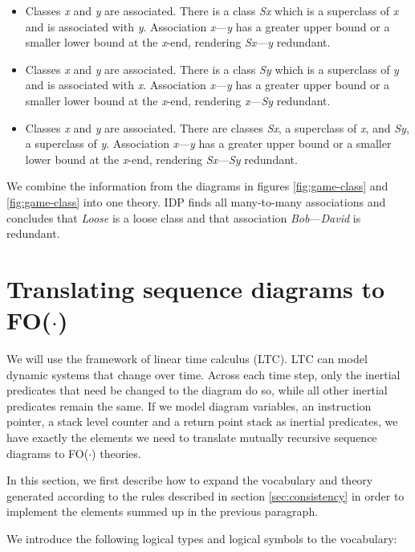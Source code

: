 \documentclass[conference]{IEEEtran}
\begin{document}
\begin{itemize}
	\item Classes \textit{x} and \textit{y} are associated. There is a class \textit{Sx} which is a superclass of \textit{x} and is associated with \textit{y}. Association \textit{x}---\textit{y} has a greater upper bound or a smaller lower bound at the \textit{x}-end, rendering \textit{Sx}---\textit{y} redundant.
	\item Classes \textit{x} and \textit{y} are associated. There is a class \textit{Sy} which is a superclass of \textit{y} and is associated with \textit{x}. Association \textit{x}---\textit{y} has a greater upper bound or a smaller lower bound at the \textit{x}-end, rendering \textit{x}---\textit{Sy} redundant.
	\item Classes \textit{x} and \textit{y} are associated. There are classes \textit{Sx}, a superclass of \textit{x}, and \textit{Sy}, a superclass of \textit{y}. Association \textit{x}---\textit{y} has a greater upper bound or a smaller lower bound at the \textit{x}-end, rendering \textit{Sx}---\textit{Sy} redundant. 
\end{itemize}

We combine the information from the diagrams in figures \ref{fig:game-class} and \ref{fig:game-class} into one theory. IDP finds all many-to-many associations and concludes that \textit{Loose} is a loose class and that association \textit{Bob}---\textit{David} is redundant.

\section{Translating sequence diagrams to FO($\cdot$)}\label{sec:seq}
We will use the framework of linear time calculus\cite{BogaertsBart2014Sdsu} (LTC). LTC can model dynamic systems that change over time. Across each time step, only the inertial predicates that need be changed to the diagram do so, while all other inertial predicates remain the same. If we model diagram variables, an instruction pointer, a stack level counter and a return point stack as inertial predicates, we have exactly the elements we need to translate mutually recursive sequence diagrams to FO($\cdot$) theories.

In this section, we first describe how to expand the vocabulary and theory generated according to the rules described in section \ref{sec:consistency} in order to implement the elements summed up in the previous paragraph.

We introduce the following logical types and logical symbols to the vocabulary:
\end{document}
